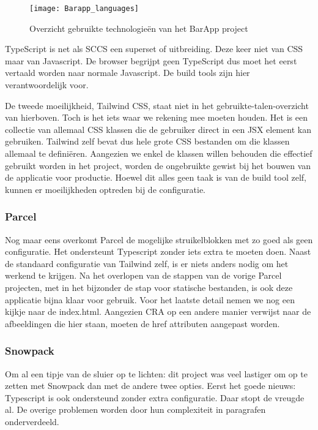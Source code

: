 \begin{figure}[h]
   \texttt{[image: Barapp\_languages]}
       \centering
       \caption{Overzicht gebruikte technologieën van het BarApp project}
 \end{figure}

TypeScript is net als SCCS een superset of uitbreiding. Deze keer niet van CSS maar van Javascript. De browser begrijpt geen TypeScript dus moet het eerst vertaald worden naar normale Javascript. De build tools zijn hier verantwoordelijk voor.

De tweede moeilijkheid, Tailwind CSS, staat niet in het gebruikte-talen-overzicht van hierboven. Toch is het iets waar we rekening mee moeten houden. Het is een collectie van allemaal CSS klassen die de gebruiker direct in een JSX element kan gebruiken. Tailwind zelf bevat dus hele grote CSS bestanden om die klassen allemaal te definiëren. Aangezien we enkel de klassen willen behouden die effectief gebruikt worden in het project, worden de ongebruikte gewist bij het bouwen van de applicatie voor productie. Hoewel dit alles geen taak is van de build tool zelf, kunnen er moeilijkheden optreden bij de configuratie.
  
\subsubsection{Parcel}

Nog maar eens overkomt Parcel de mogelijke struikelblokken met zo goed als geen configuratie. Het ondersteunt Typescript zonder iets extra te moeten doen. Naast de standaard configuratie van Tailwind zelf, is er niets anders nodig om het werkend te krijgen. Na het overlopen van de stappen van de vorige Parcel projecten, met in het bijzonder de stap voor statische bestanden, is ook deze applicatie bijna klaar voor gebruik. Voor het laatste detail nemen we nog een kijkje naar de index.html. Aangezien CRA op een andere manier verwijst naar de afbeeldingen die hier staan, moeten de href attributen aangepast worden.

\subsubsection{Snowpack}
Om al een tipje van de sluier op te lichten: dit project was veel lastiger om op te zetten met Snowpack dan met de andere twee opties. Eerst het goede nieuws: Typescript is ook ondersteund zonder extra configuratie. Daar stopt de vreugde al. De overige problemen worden door hun complexiteit in paragrafen onderverdeeld.

